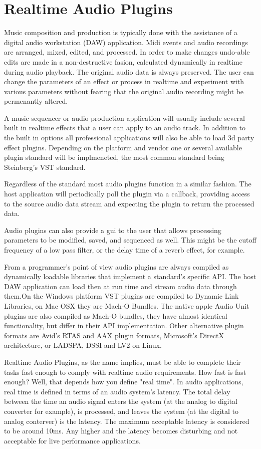 \section{Realtime Audio Plugins}

Music composition and production is typically done with the assistance of a digital audio workstation (DAW) application. Midi events and audio recordings are arranged, mixed, edited, and processed. In order to make changes undo-able edits are made in a non-destructive fasion, calculated dynamically in realtime during audio playback. The original audio data is always preserved. The user can change the parameters of an effect or process in realtime and experiment with various parameters without fearing that the original audio recording might be permenantly altered.

A music sequencer or audio production application will usually include several built in realtime effects that a user can apply to an audio track. In addition to the built in options all professional applications will also be able to load 3d party effect plugins. Depending on the platform and vendor one or several available plugin standard will be implmeneted, the most common standard being Steinberg's VST standard.

Regardless of the standard most audio plugins function in a similar fashion. The host application will periodically poll the plugin via a callback, providing access to the source audio data stream and expecting the plugin to return the processed data.

Audio plugins can also provide a gui to the user that allows processing parameters to be modified, saved, and sequenced as well. This might be the cutoff frequency of a low pass filter, or the delay time of a reverb effect, for example.

From a programmer's point of view audio plugins are always compiled as dynamically loadable libraries that implement a standard's specific API. The host DAW application can load then at run time and stream audio data through them\cite{realtime-architectures}.On the Windows platform VST plugins are compiled to Dynamic Link Libraries, on Mac OSX they are Mach-O Bundles. The native apple Audio Unit plugins are also compiled as Mach-O bundles, they have almost identical functionality, but differ in their API implementation. Other alternative plugin formats are Avid's RTAS and AAX plugin formats, Microsoft's DirectX architecture, or LADSPA, DSSI and LV2 on Linux.

Realtime Audio Plugins, as the name implies, must be able to complete their tasks fast enough to comply with realtime audio requirements. How fast is fast enough? Well, that depends how you define "real time". In audio applications, real time is defined in terms of an audio system's latency. The total delay between the time an audio signal enters the system (at the analog to digital converter for example), is processed, and leaves the system (at the digital to analog conterver) is the latency. The maximum acceptable latency is considered to be around 10ms\cite{AES67-2013}. Any higher and the latency becomes disturbing and not acceptable for live performance applications.

